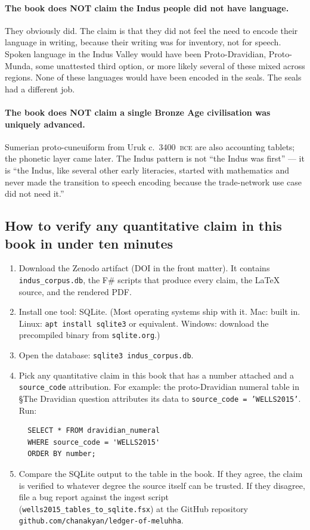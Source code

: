 \paragraph{The book does NOT claim the Indus people did not have
language.} They obviously did. The claim is that they did not feel
the need to encode their language in writing, because their
writing was for inventory, not for speech. Spoken language in
the Indus Valley would have been Proto-Dravidian, Proto-Munda,
some unattested third option, or more likely several of these
mixed across regions. None of these languages would have been
encoded in the seals. The seals had a different job.

\paragraph{The book does NOT claim a single Bronze Age
civilisation was uniquely advanced.} Sumerian proto-cuneuiform
from Uruk c.\ 3400~\textsc{bce} are also accounting tablets; the
phonetic layer came later. The Indus pattern is not ``the Indus
was first'' --- it is ``the Indus, like several other early
literacies, started with mathematics and never made the
transition to speech encoding because the trade-network use case
did not need it.''

\subsection{How to verify any quantitative claim in this book in
under ten minutes}

\begin{enumerate}
\item Download the Zenodo artifact (DOI in the front matter). It
  contains \texttt{indus\_corpus.db}, the F\# scripts that produce
  every claim, the LaTeX source, and the rendered PDF.
\item Install one tool: SQLite. (Most operating systems ship with
  it. Mac: built in. Linux: \texttt{apt install sqlite3} or
  equivalent. Windows: download the precompiled binary from
  \texttt{sqlite.org}.)
\item Open the database:
  \texttt{sqlite3 indus\_corpus.db}.
\item Pick any quantitative claim in this book that has a number
  attached and a \texttt{source\_code} attribution. For example:
  the proto-Dravidian numeral table in §The Dravidian question
  attributes its data to \texttt{source\_code = 'WELLS2015'}.
  Run:
\begin{verbatim}
  SELECT * FROM dravidian_numeral
  WHERE source_code = 'WELLS2015'
  ORDER BY number;
\end{verbatim}
\item Compare the SQLite output to the table in the book. If they
  agree, the claim is verified to whatever degree the source
  itself can be trusted. If they disagree, file a bug report
  against the ingest script
  (\texttt{wells2015\_tables\_to\_sqlite.fsx}) at the GitHub
  repository \texttt{github.com/chanakyan/ledger-of-meluhha}.
\end{enumerate}

